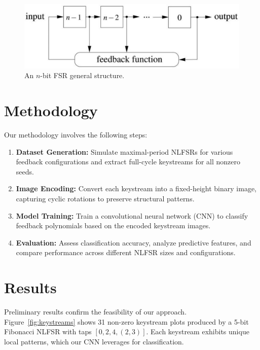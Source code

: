 \documentclass[conference]{IEEEtran}
\begin{document}
\begin{figure}[ht]
  \centering
  \includegraphics[max width=\columnwidth]{block_diagram.jpg}
  \caption{An $n$-bit FSR general structure.}
  \label{fig:block_diagram}
\end{figure}

\section{Methodology}
Our methodology involves the following steps:
\begin{enumerate}
  \item \textbf{Dataset Generation:} Simulate maximal-period NLFSRs for various feedback configurations and extract full-cycle keystreams for all nonzero seeds.
  \item \textbf{Image Encoding:} Convert each keystream into a fixed-height binary image, capturing cyclic rotations to preserve structural patterns.
  \item \textbf{Model Training:} Train a convolutional neural network (CNN) to classify feedback polynomials based on the encoded keystream images.
  \item \textbf{Evaluation:} Assess classification accuracy, analyze predictive features, and compare performance across different NLFSR sizes and configurations.
\end{enumerate}


\section{Results}
Preliminary results confirm the feasibility of our approach. Figure~\ref{fig:keystreams} shows 31 non-zero keystream plots produced by a 5-bit Fibonacci NLFSR with taps $[0,2,4,(2,3)]$. Each keystream exhibits unique local patterns, which our CNN leverages for classification.
\end{document}
